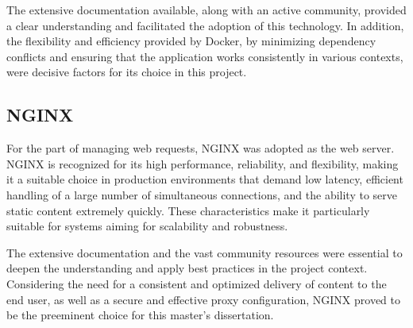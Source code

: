 The extensive documentation available, along with an active community, provided a clear understanding and facilitated the adoption of this technology. In addition, the flexibility and efficiency provided by Docker, by minimizing dependency conflicts and ensuring that the application works consistently in various contexts, were decisive factors for its choice in this project.

\subsection{NGINX}
For the part of managing web requests, NGINX \cite{nginxDocs} was adopted as the web server. NGINX is recognized for its high performance, reliability, and flexibility, making it a suitable choice in production environments that demand low latency, efficient handling of a large number of simultaneous connections, and the ability to serve static content extremely quickly. These characteristics make it particularly suitable for systems aiming for scalability and robustness.

The extensive documentation and the vast community resources were essential to deepen the understanding and apply best practices in the project context. Considering the need for a consistent and optimized delivery of content to the end user, as well as a secure and effective proxy configuration, NGINX proved to be the preeminent choice for this master's dissertation.